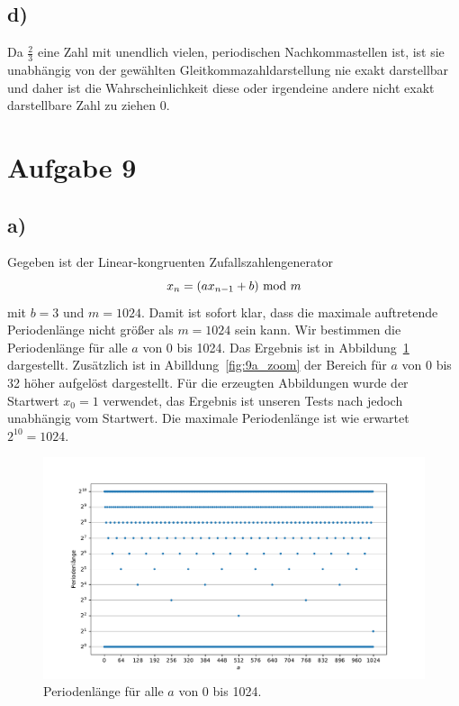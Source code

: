 \documentclass[a4paper, 11pt]{article}
\begin{document}
\subsection*{d)}
Da $\frac{2}{3}$ eine Zahl mit unendlich vielen, periodischen Nachkommastellen ist, ist sie unabhängig von der gewählten Gleitkommazahldarstellung nie exakt darstellbar und daher ist die Wahrscheinlichkeit diese oder irgendeine andere nicht exakt darstellbare Zahl zu ziehen 0.

\section*{Aufgabe 9}
\subsection*{a)}
Gegeben ist der Linear-kongruenten Zufallszahlengenerator
\begin{equation}
    x_n = (ax_{n-1} + b)\ \textup{mod}\ m
    \label{eqn:linkon}
\end{equation}
mit $b = 3$ und $m = 1024$. Damit ist sofort klar, dass die maximale auftretende Periodenlänge nicht größer als $m = 1024$ sein kann. Wir bestimmen die Periodenlänge für alle $a$ von 0 bis 1024. Das Ergebnis ist in Abbildung~\ref{fig:9a_full} dargestellt. Zusätzlich ist in Abilldung~\ref{fig:9a_zoom} der Bereich für $a$ von 0 bis 32 höher aufgelöst dargestellt. Für die erzeugten Abbildungen wurde der Startwert $x_0 = 1$ verwendet, das Ergebnis ist unseren Tests nach jedoch unabhängig vom Startwert. Die maximale Periodenlänge ist wie erwartet $2^{10} = 1024$.
\begin{figure}
    \centering
    \includegraphics[width=\textwidth]{../A09/A9a_full.pdf}
    \caption{Periodenlänge für alle $a$ von 0 bis 1024.}
    \label{fig:9a_full}
\end{figure}
\end{document}
